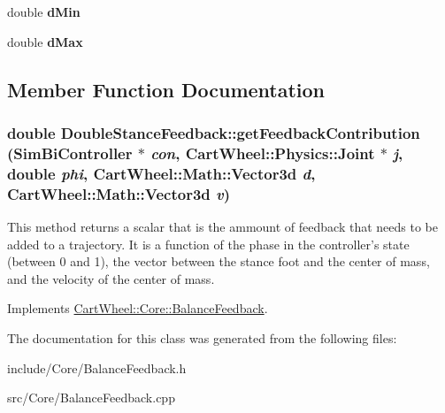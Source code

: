 \begin{DoxyCompactItemize}
\item 
\hypertarget{classCartWheel_1_1Core_1_1DoubleStanceFeedback_a7e034a4171694ec4cc234e08328ea47a}{
double {\bfseries dMin}}
\label{classCartWheel_1_1Core_1_1DoubleStanceFeedback_a7e034a4171694ec4cc234e08328ea47a}

\item 
\hypertarget{classCartWheel_1_1Core_1_1DoubleStanceFeedback_a480260d84488d516e6eacae28e26cceb}{
double {\bfseries dMax}}
\label{classCartWheel_1_1Core_1_1DoubleStanceFeedback_a480260d84488d516e6eacae28e26cceb}

\end{DoxyCompactItemize}


\subsection{Member Function Documentation}
\hypertarget{classCartWheel_1_1Core_1_1DoubleStanceFeedback_a5110582f3dff7c283bbc93bff221b8d2}{
\subsubsection[{getFeedbackContribution}]{\setlength{\rightskip}{0pt plus 5cm}double DoubleStanceFeedback::getFeedbackContribution ({\bf SimBiController} $\ast$ {\em con}, \/  {\bf CartWheel::Physics::Joint} $\ast$ {\em j}, \/  double {\em phi}, \/  {\bf CartWheel::Math::Vector3d} {\em d}, \/  {\bf CartWheel::Math::Vector3d} {\em v})}}
\label{classCartWheel_1_1Core_1_1DoubleStanceFeedback_a5110582f3dff7c283bbc93bff221b8d2}
This method returns a scalar that is the ammount of feedback that needs to be added to a trajectory. It is a function of the phase in the controller's state (between 0 and 1), the vector between the stance foot and the center of mass, and the velocity of the center of mass. 

Implements \hyperlink{classCartWheel_1_1Core_1_1BalanceFeedback_aa76a657676cd048cecfcd7963beb35cb}{CartWheel::Core::BalanceFeedback}.



The documentation for this class was generated from the following files:\begin{DoxyCompactItemize}
\item 
include/Core/BalanceFeedback.h\item 
src/Core/BalanceFeedback.cpp\end{DoxyCompactItemize}
